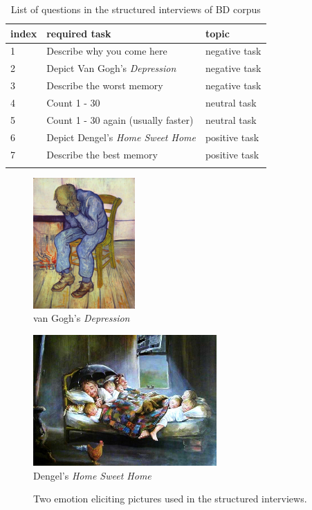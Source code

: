 \begin{table}[ht]
    \centering
    \caption{List of questions in the structured interviews of BD corpus}
    \begin{tabular}{l|l|l}
        \Xhline{2\arrayrulewidth}
        index & required task & topic \\
        \hline
        1 & Describe why you come here & negative task \\
        2 & Depict Van Gogh's \textit{Depression} & negative task \\
        3 & Describe the worst memory & negative task \\
        \hline
        4 & Count 1 - 30 & neutral task \\
        5 & Count 1 - 30 again (usually faster) & neutral task \\
        \hline
        6 & Depict Dengel's \textit{Home Sweet Home} & positive task \\
        7 & Describe the best memory & positive task \\
        \Xhline{2\arrayrulewidth}
    \end{tabular}
    \label{tab:question}
\end{table}

\begin{figure}[ht]
    \centering
    \begin{minipage}[c]{0.30\textwidth}
    \centering
    \includegraphics[height=5cm]{./images/dataset/dataset_depression.jpg} \\
    van Gogh's \textit{Depression}
    \end{minipage}
    \begin{minipage}[c]{0.55\textwidth}
    \centering
    \includegraphics[height=5cm]{./images/dataset/dataset_sweet_home.jpg} \\
    Dengel's \textit{Home Sweet Home}
    \end{minipage}
    \caption{Two emotion eliciting pictures used in the structured interviews.}
    \label{fig:drawing}
\end{figure}


